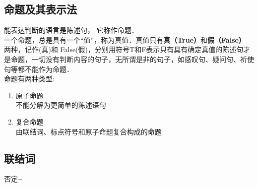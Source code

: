 \subsection{命题及其表示法}



\begin{definition}{}
能表达判断的语言是陈述句， 它称作命题．\\ 
 一个命题，总是具有一个“值”，称为真值．真值只有\textbf{真（True）}和\textbf{假（False）} 两种，记作(真)和 False(假)，分别用符号T和F表示只有具有确定真值的陈述句才是命题，一切没有判断内容的句子，无所谓是非的句子，如感叹句、疑问句、祈使句等都不能作为命题．
\\
命题有两种类型:
\begin{enumerate}
\item 原子命题\\不能分解为更简单的陈述语句
\item 复合命题\\由联结词、标点符号和原子命题复合构成的命题
\end{enumerate} 
\end{definition}


\subsection{联结词}

\begin{definition}{否定$\neg$ }\end{definition} 
